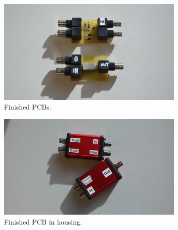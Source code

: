 \begin{figure}[ht]
	\centering
	\begin{subfigure}{0.4\textwidth}
		\centering
		\includegraphics[width=\textwidth]{Chapters/Deflection/PS_CTT_16zu9.JPG}
		\caption{Finished PCBs.}
		\label{fig:ctt_ps}
	\end{subfigure}
	\hspace{0.1\textwidth}
	\begin{subfigure}{0.4\textwidth}
		\centering
		\includegraphics[width=\textwidth]{Chapters/Deflection/PS_CTT1_16zu9.JPG}
		\caption{Finished PCB in housing.}
		\label{fig:ctt_ps_housed}
	\end{subfigure}
	\caption{}
	\label{fig:CTT}
\end{figure}




